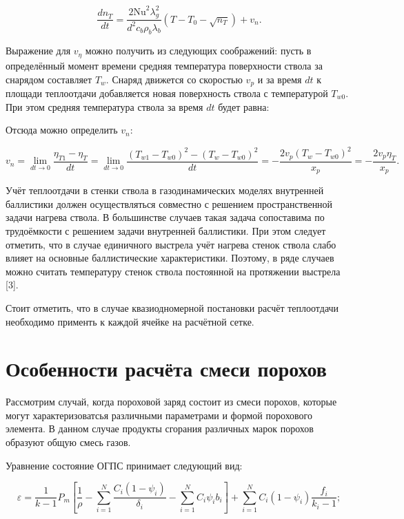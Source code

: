 \documentclass[14pt, a4paper]{report} %
\begin{document}
\begin{equation}
\frac{dn_T}{dt} = \frac{2 \mathrm{Nu}^2 \lambda_g^2}{d^2 c_b \rho_b \lambda_b} \left( T - T_0 - \sqrt{n_T} \right) + v_n.
\end{equation}

Выражение для \( v_\eta \) можно получить из следующих соображений: пусть в определённый момент времени средняя температура поверхности ствола за снарядом составляет \( T_w \). Снаряд движется со скоростью \( v_p \) и за время \( dt \) к площади теплоотдачи добавляется новая поверхность ствола с температурой \( T_{w0} \). При этом средняя температура ствола за время \( dt \) будет равна:

Отсюда можно определить \( v_n \):

\[
v_n = \lim_{dt \to 0} \frac{\eta_{T1} - \eta_T}{dt} = \lim_{dt \to 0} \frac{(T_{w1} - T_{w0})^2 - (T_w - T_{w0})^2}{dt} = -\frac{2v_p (T_w - T_{w0})^2}{x_p} = -\frac{2v_p \eta_T}{x_p}.
\]

Учёт теплоотдачи в стенки ствола в газодинамических моделях внутренней баллистики должен осуществляться совместно с решением пространственной задачи нагрева ствола. В большинстве случаев такая задача сопоставима по трудоёмкости с решением задачи внутренней
баллистики. При этом следует отметить, что в случае единичного выстрела учёт нагрева стенок ствола слабо влияет на основные баллистические характеристики. Поэтому, в ряде случаев можно считать температуру стенок ствола постоянной на протяжении выстрела [3].

Стоит отметить, что в случае квазиодномерной постановки расчёт теплоотдачи необходимо применть к каждой ячейке на расчётной сетке.

\section{Особенности расчёта смеси порохов}

Рассмотрим случай, когда пороховой заряд состоит из смеси порохов, которые могут характеризоватсья различными параметрами и формой порохового элемента. В данном случае продукты сгорания различных марок порохов образуют общую смесь газов.

Уравнение состояние ОГПС принимает следующий вид:

\begin{equation}
\varepsilon = \frac{1}{k-1} P_m \left[ \frac{1}{\rho} - \sum_{i=1}^N \frac{C_i (1 - \psi_i)}{\delta_i} - \sum_{i=1}^N C_i \psi_i b_i \right] + \sum_{i=1}^N C_i (1 - \psi_i) \frac{f_i}{k_i - 1}; 
\end{equation}
\end{document}

